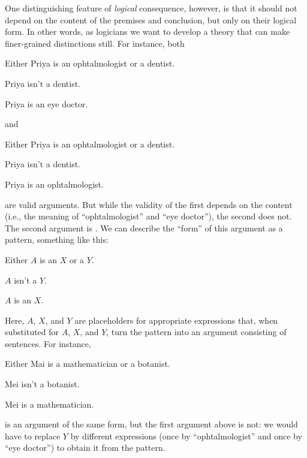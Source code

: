 One distinguishing feature of \emph{logical} consequence, however, is that it should not depend on the content of the premises and conclusion, but only on their logical form. In other words, as logicians we want to develop a theory that can make finer-grained distinctions still. For instance, both
\begin{earg}
	\item[] Either Priya is an ophtalmologist or a dentist.
	\item[] Priya isn't a dentist.
	\item[\therefore] Priya is an eye doctor.
\end{earg}
and
\begin{earg}
	\item[] Either Priya is an ophtalmologist or a dentist.
	\item[] Priya isn't a dentist.
	\item[\therefore] Priya is an ophtalmologist.
\end{earg}
are valid arguments. But while the validity of the first depends on the content (i.e., the meaning of ``ophtalmologist'' and ``eye doctor''), the second does not. The second argument is . We can describe the ``form'' of this argument as a pattern, something like this:
\begin{earg}
	\item[] Either $A$ is an $X$ or a $Y$.
	\item[] $A$ isn't a $Y$.
	\item[\therefore] $A$ is an $X$.
\end{earg}
Here, $A$, $X$, and $Y$ are placeholders for appropriate expressions that, when substituted for $A$, $X$, and $Y$, turn the pattern into an argument consisting of sentences. For instance,
\begin{earg}
	\item[] Either Mai is a mathematician or a botanist.
	\item[] Mei isn't a botanist.
	\item[\therefore] Mei is a mathematician.
\end{earg}
is an argument of the same form, but the first argument above is not: we would have to replace $Y$ by different expressions (once by ``ophtalmologist'' and once by ``eye doctor'') to obtain it from the pattern.

